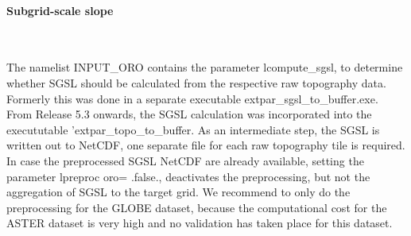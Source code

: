 \documentclass[a4paper,10pt,DIV14,BCOR1cm,titlepage,twoside]{scrartcl}
\begin{document}
\paragraph{Subgrid-scale slope}\ \par\medskip\noindent
The namelist INPUT\_ORO contains the parameter lcompute\_sgsl, to determine whether SGSL should be calculated from the respective raw topography data. Formerly this was done in a separate executable extpar\_sgsl\_to\_buffer.exe. From Release 5.3 onwards, the SGSL calculation was incorporated into the execututable 'extpar\_topo\_to\_buffer. As an intermediate step, the SGSL is written out to NetCDF, one separate file for each raw topography tile is required. In case the preprocessed SGSL NetCDF are already available, setting the parameter lpreproc oro= .false., deactivates the preprocessing, but not the aggregation of SGSL to the target grid. We recommend to only do the preprocessing for the GLOBE dataset, because the computational cost for the ASTER dataset is very high and no validation has taken place for this dataset.
\end{document}
